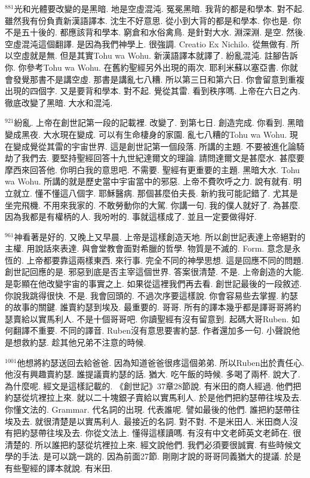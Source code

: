 \documentclass{book}
\begin{document}
$^{881}$光和光體要改變的是黑暗.
地是空虛混沌.
冤冕黑暗.
我背的都是和學本.
對不起.
雖然我有份負責新漢語譯本.
沈生不好意思.
從小到大背的都是和學本.
你也是.
你不是五十後的.
都應該背和學本.
窮倉和水俗禽鳥.
是針對大水.
淵深淵.
是空.
然後.
空虛混沌這個翻譯.
是因為我們神學上.
很強調.
Creatio Ex Nichilo.
從無做有.
所以空虛就是無.
但是其實Tohu wa Wohu.
新漢語譯本就譯了.
紛亂混沌.
註腳告訴你.
你參考Tohu wa Wohu.
在舊約聖經另外出現的兩次.
耶利米蘇以塞亞書.
你就會發覺那書不是講空虛.
那書是講亂七八糟.
所以第三日和第六日.
你會留意到重複出現的四個字.
又是要背和學本.
對不起.
覺從其雷.
看到秩序嗎.
上帝在六日之內.
徹底改變了黑暗.
大水和混沌.

$^{921}$紛亂.
上帝在創世記第一段的記載裡.
改變了.
到第七日.
創造完成.
你看到.
黑暗變成黑夜.
大水現在變成.
可以有生命棲身的家園.
亂七八糟的Tohu wa Wohu.
現在變成覺從其雷的宇宙世界.
這是創世記第一個段落.
所講的主題.
不要被進化論騎劫了我們去.
要堅持聖經回答十九世紀達爾文的理論.
請問達爾文是甚麼水.
甚麼要摩西來回答他.
你明白我的意思吧.
不需要.
聖經有更重要的主題.
黑暗大水.
Tohu wa Wohu.
所講的就是歷史當中宇宙當中的邪惡.
上帝不費吹呼之力.
說有就有.
明立就立.
懂不懂這八個字.
耶穌醫病.
那個甚麼伯夫長.
新約我可能記錯了.
尤其是坐完飛機.
不用來我家的.
不敢勞動你的大駕.
你講一句.
我的僕人就好了.
為甚麼.
因為我都是有權柄的人.
我吩咐的.
事就這樣成了.
並且一定要做得好.

$^{961}$神看著是好的.
又晚上又早晨.
上帝是這樣創造天地.
所以創世記表達上帝絕對的主權.
用說話來表達.
與會堂教會面對希臘的哲學.
物質是不滅的.
Form.
意念是永恆的.
上帝都要靠這兩樣東西.
來行事.
完全不同的神學思想.
這是回應不同的問題.
創世記回應的是.
邪惡到底是否主宰這個世界.
答案很清楚.
不是.
上帝創造的大能.
是彰顯在他改變宇宙的事實之上.
如果從這裡我們再去看.
創世記最後的一段敘述.
你說我跳得很快.
不是.
我會回頭的.
不過次序要這樣說.
你會容易些去掌握.
約瑟的故事的關鍵.
誰賣約瑟到埃及.
最重要的.
哥哥.
所有的譯本幾乎都是譯哥哥將約瑟賣給以實馬利人.
不是十個哥哥吧.
你讀聖經有沒有留意到.
起碼大哥Ruben.
如何翻譯不重要.
不同的譯音.
Ruben沒有意思要害約瑟.
作者還加多一句.
小聲說他是想救約瑟.
趁其他兄弟不注意的時候.

$^{1001}$他想將約瑟送回去給爸爸.
因為知道爸爸很疼這個弟弟.
所以Ruben出於責任心.
他沒有興趣賣約瑟.
誰提議賣約瑟的話.
猶大.
吃午飯的時候.
多喝了兩杯.
說大了.
為什麼呢.
經文是這樣記載的.
《創世記》37章28節說.
有米田的商人經過.
他們把約瑟從坑裡拉上來.
就以二十塊銀子賣給以實馬利人.
於是他們把約瑟帶往埃及去.
你懂文法的.
Grammar.
代名詞的出現.
代表誰呢.
譬如最後的他們.
誰把約瑟帶往埃及去.
就很清楚是以實馬利人.
最接近的名詞.
對不對.
不是米田人.
米田商人沒有把約瑟帶往埃及去.
你從文法上.
懂得這樣讀嗎.
有沒有中文老師英文老師在.
很清楚的.
所以誰把約瑟從坑裡拉上來.
經文說他們.
我們必須要很誠實.
有些時候文學的手法.
是可以跳一跳的.
因為前面27節.
剛剛才說的哥哥同義猶大的提議.
於是有些聖經的譯本就說.
有米田.
\end{document}
